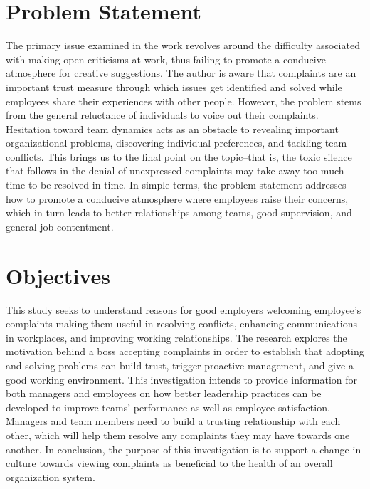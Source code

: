 \documentclass[a4paper,12pt]{report}
\begin{document}
\section{Problem Statement}
\begin{enumerate}
The primary issue examined in the work revolves around the difficulty associated with making open criticisms at work, thus failing to promote a conducive atmosphere for creative suggestions. The author is aware that complaints are an important trust measure through which issues get identified and solved while employees share their experiences with other people. However, the problem stems from the general reluctance of individuals to voice out their complaints. Hesitation toward team dynamics acts as an obstacle to revealing important organizational problems, discovering individual preferences, and tackling team conflicts. This brings us to the final point on the topic–that is, the toxic silence that follows in the denial of unexpressed complaints may take away too much time to be resolved in time. In simple terms, the problem statement addresses how to promote a conducive atmosphere where employees raise their concerns, which in turn leads to better relationships among teams, good supervision, and general job contentment.
\end{enumerate}

\section{Objectives}
\begin{enumerate}
This study seeks to understand reasons for good employers welcoming employee’s complaints making them useful in resolving conflicts, enhancing communications in workplaces, and improving working relationships. The research explores the motivation behind a boss accepting complaints in order to establish that adopting and solving problems can build trust, trigger proactive management, and give a good working environment. This investigation intends to provide information for both managers and employees on how better leadership practices can be developed to improve teams’ performance as well as employee satisfaction. Managers and team members need to build a trusting relationship with each other, which will help them resolve any complaints they may have towards one another. In conclusion, the purpose of this investigation is to support a change in culture towards viewing complaints as beneficial to the health of an overall organization system.
\end{enumerate}
\end{document}
